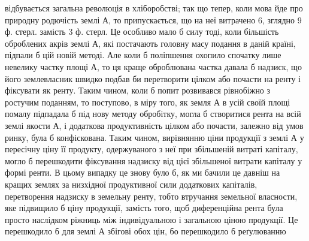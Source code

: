 відбувається загальна революція в хліборобстві; так що тепер, коли мова йде
про природну родючість землі А, то припускається, що на неї витрачено 6, зглядно
9 ф. стерл. замість 3 ф. стерл. Це особливо мало б силу тоді, коли більшість
оброблених акрів землі А, які постачають головну масу подання в даній країні,
підпали б цій новій методі. Але коли б поліпшення охопило спочатку лише
невелику частку площі А, то ця краще оброблювана частка давала б надзиск,
що його землевласник швидко подбав би перетворити цілком або почасти
на ренту і фіксувати як ренту. Таким чином, коли б попит розвивався рівнобіжно
з ростучим поданням, то поступово, в міру того, як земля А в усій своїй площі
помалу підпадала б під нову методу обробітку, могла б створитися рента
на всій землі якости А, і додаткова продуктивність цілком або почасти, залежно
від умов ринку, була б конфіскована. Таким чином, вирівнянню ціни продукції
з землі А у пересічну ціну її продукту, одержуваного з неї при збільшеній витраті
капіталу, могло б перешкодити фіксування надзиску від цієї збільшеної витрати
капіталу у формі ренти. В цьому випадку це знову було б, як ми бачили це
давніш на кращих землях за низхідної продуктивної сили додаткових капіталів,
перетворення надзиску в земельну ренту, тобто втручання земельної власности,
яке підвищило б ціну продукції, замість того, щоб диференційна рента була
просто наслідком ріжниць між індивідуальною і загальною ціною продукції. Це
перешкодило б для землі А збігові обох цін, бо перешкодило б реґулюванню
\parbreak{}  %
